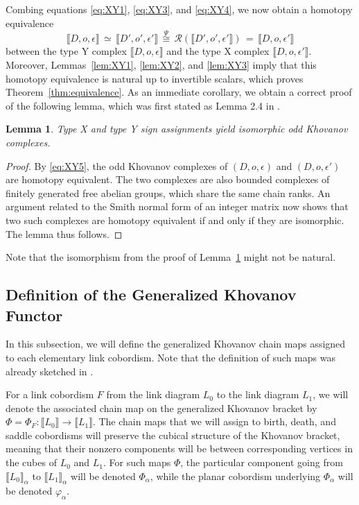 \documentclass[12pt]{amsart}
\theoremstyle{definition}
\theoremstyle{plain}
\newtheorem{lemma}{Lemma}
\begin{document}
Combing equations \eqref{eq:XY1}, \eqref{eq:XY3}, and \eqref{eq:XY4}, we now obtain a homotopy equivalence
\begin{equation}\label{eq:XY5}
\llbracket D,o,\epsilon\rrbracket\,\simeq\,\llbracket D',o',\epsilon'\rrbracket\,\stackrel{\Psi}{\cong}\,
\mathcal{R}(\llbracket D',o',\epsilon'\rrbracket)\,=\,\llbracket D,o,\epsilon'\rrbracket
\end{equation}
between the type Y complex $\llbracket D,o,\epsilon\rrbracket$ and the type X complex
$\llbracket D,o,\epsilon'\rrbracket$. Moreover,
Lemmas~\ref{lem:XY1}, \ref{lem:XY2}, and \ref{lem:XY3}
imply that this
homotopy equivalence is natural up to invertible scalars,
which proves Theorem~\ref{thm:equivalence}.
As an immediate corollary, we obtain a correct proof of the following lemma,
which was first stated as Lemma 2.4 in \cite{ORS2007}.

\begin{lemma}\label{lem:XY4} Type X and type Y sign assignments yield isomorphic odd Khovanov complexes.
\end{lemma}

\begin{proof} By \eqref{eq:XY5}, the odd Khovanov complexes of $(D,o,\epsilon)$ and $(D,o,\epsilon')$ are homotopy equivalent.
The two complexes are also bounded complexes of finitely generated free abelian groups, which share the same chain ranks.
An argument related to the Smith normal form of an integer matrix now shows that two such complexes are homotopy equivalent if and only if they are isomorphic.
The lemma thus follows.
\end{proof}

Note that the isomorphism from the proof of Lemma~\ref{lem:XY4} might not be natural.

\subsection{Definition of the Generalized Khovanov Functor}
In this subsection, we will define the generalized Khovanov chain maps assigned to each elementary link cobordism. Note that the definition
of such maps was already sketched in \cite{Pu2015}.

For a link cobordism $F$ from the link diagram $L_0$ to the link diagram $L_1$, we will denote the associated chain map on the generalized Khovanov bracket by $\Phi=\Phi_F\colon\llbracket L_0\rrbracket\rightarrow\llbracket L_1\rrbracket$. The chain maps that we will assign to birth, death, and saddle
cobordisms will preserve the cubical structure of the Khovanov bracket, meaning that their nonzero components
will be between corresponding vertices in the cubes of $L_0$ and  $L_1$.
For such maps $\Phi$, the particular component going from $\llbracket L_0\rrbracket_\alpha$ to $\llbracket L_1\rrbracket_\alpha$ will be denoted $\Phi_\alpha$, while the planar cobordism underlying $\Phi_\alpha$ will be denoted $\varphi_\alpha$.  
\end{document}
